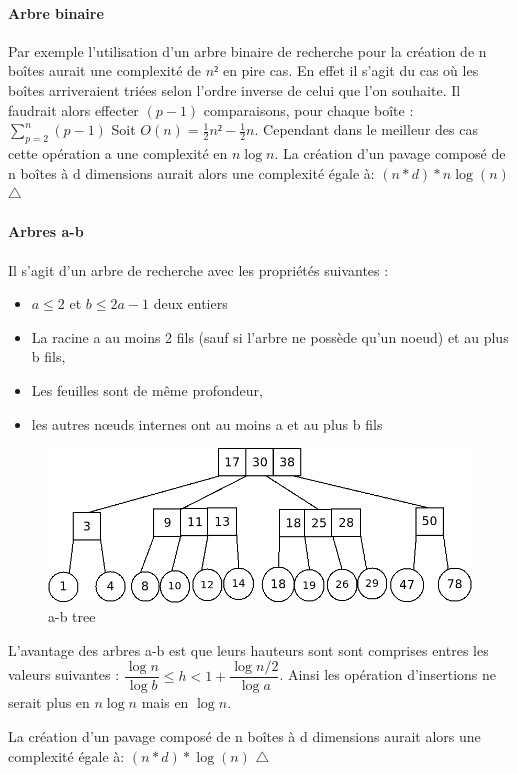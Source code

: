 \paragraph{Arbre binaire}
Par exemple l'utilisation d'un arbre binaire de recherche pour la création de n boîtes aurait une complexité de $n²$ en pire cas. En effet il s'agit du cas où les boîtes arriveraient triées selon l'ordre inverse de celui que l'on souhaite. Il faudrait alors effecter $(p-1)$ comparaisons, pour chaque boîte :  $\sum_{p=2}^{n}(p-1)$  Soit $O(n)=\frac{1}{2}n²-\frac{1}{2}n$. Cependant dans le meilleur des cas cette opération a une complexité en $n\log{n}$.
La création d'un pavage composé de n boîtes à d dimensions aurait alors une complexité égale à: $(n*d)*n\log(n)$ $\triangle$
\clearpage
\paragraph{Arbres a-b}
Il s'agit d'un arbre de recherche avec les propriétés suivantes :
\begin{itemize}
\item
$a\leq2$ et $b\leq 2a−1$ deux entiers
\item
La racine a au moins 2 fils (sauf si l'arbre ne possède qu'un noeud) et au plus b fils,
\item 
Les feuilles sont de même profondeur,
\item
les autres nœuds internes ont au moins a et au plus b fils
\end{itemize}

\begin{figure}[htbp]
  \centering
  \includegraphics[scale=0.40]{img/abtree}
  \caption{a-b tree}
  \label{fig:dnuages}
\end{figure}


L'avantage des arbres a-b est que leurs hauteurs sont sont comprises entres les valeurs suivantes : $ \dfrac{\log{n}}{\log{b}}   \leq h  < 1 + \dfrac{\log{n/2}}{\log{a}}$. Ainsi les opération d'insertions ne serait plus en $n\log{n}$ mais en $\log{n}$.

La création d'un pavage composé de n boîtes à d dimensions aurait alors une complexité égale à: $(n*d)*\log(n)$ $\triangle$
